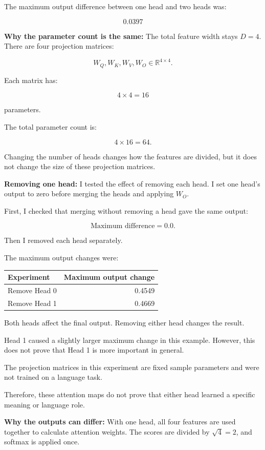 \documentclass[11pt]{article}
\begin{document}
The maximum output difference between
one head and two heads was:

\[
\boxed{0.0397}
\]

\textbf{Why the parameter count is the same:} The total feature width stays $D=4$.
There are four projection matrices:

\[
W_Q,W_K,W_V,W_O\in\mathbb{R}^{4\times4}.
\]

Each matrix has:

\[
4\times4=16
\]

parameters.

The total parameter count is:

\[
4\times16=\boxed{64}.
\]

Changing the number of heads changes how
the features are divided, but it does not
change the size of these projection matrices.

\textbf{Removing one head:} I tested the effect of removing each head. I set one head's output to zero before
merging the heads and applying $W_O$.

First, I checked that merging without removing a head gave the same output:

\[
\text{Maximum difference}=0.0.
\]

Then I removed each head separately.

The maximum output changes were:

\begin{center}
\begin{tabular}{lr}
\toprule
Experiment & Maximum output change \\
\midrule
Remove Head 0 & 0.4549 \\
Remove Head 1 & 0.4669 \\
\bottomrule
\end{tabular}
\end{center}

Both heads affect the final output.
Removing either head changes the result.

Head 1 caused a slightly larger maximum
change in this example. However, this does
not prove that Head 1 is more important
in general.

The projection matrices in this experiment
are fixed sample parameters and were not
trained on a language task.

Therefore, these attention maps do not prove
that either head learned a specific meaning
or language role.

\textbf{Why the outputs can differ:} With one head, all four features are used together
to calculate attention weights. The scores are
divided by $\sqrt{4}=2$, and softmax is applied once.
\end{document}

